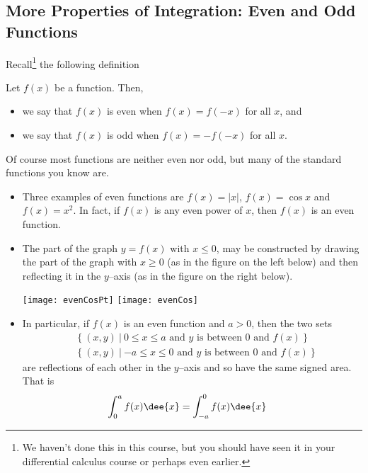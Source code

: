 \subsection{More Properties of Integration: Even and Odd Functions}
Recall\footnote{We haven't done this in this course, but you should have seen
it in your differential calculus course or perhaps even earlier.} the following
definition
\begin{defn}
  Let $f(x)$ be a function. Then,
 \begin{itemize}
  \item we say that $f(x)$ is even when $f(x)=f(-x)$ for all $x$, and
  \item we say that $f(x)$ is odd when $f(x)=-f(-x)$ for all $x$.
 \end{itemize}
\end{defn}
Of course most functions are neither even nor odd, but many of the standard
functions you know are.
\begin{eg}\label{eg:lefthalfevenfunction}
\begin{itemize}
   \item Three examples of even functions are $f(x)=|x|$, $f(x)=\cos x$ and
  $f(x)=x^2$. In fact, if $f(x)$ is any even power of $x$, then $f(x)$ is an
even function.
   \item The part of the graph $y=f(x)$ with $x\le 0$, may be constructed by
         drawing the part of the graph with $x\ge 0$ (as in the figure
         on the left below) and then reflecting it in the $y$--axis
         (as in the figure on the right below).
        \begin{efig}
        \begin{center}
            \texttt{[image: evenCosPt]}\qquad
            \texttt{[image: evenCos]}
         \end{center}
         \end{efig}
  \item In particular, if $f(x)$ is an even function and $a>0$, then
      the two sets
   \begin{align*}
     &\big\{\ (x,y)\ \big|\
       \text{$0\le x\le a$ and $y$ is between $0$ and $f(x)$} \ \big\} \\
     &\big\{\ (x,y)\ \big|\
       \text{$-a\le x\le 0$ and $y$ is between $0$ and $f(x)$} \ \big\}
    \end{align*}
   are reflections of each other in the $y$--axis and so have the same
   signed area. That is
  \begin{align*}
        \int_0^a f(x)\dee{x} &= \int_{-a}^0 f(x)\dee{x}
  \end{align*}
   \end{itemize}
\end{eg}
